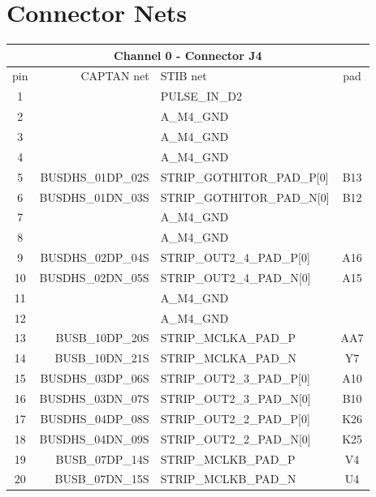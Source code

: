 \documentclass[11pt]{article}
\begin{document}
\section{Connector Nets}
\begin{table}
\begin{center}
\scriptsize
\begin{tabular}{|c|r|l|c|} \hline
\multicolumn{4}{|c|}{Channel 0 - Connector J4} \\ \hline
pin & CAPTAN net & STIB net & pad \\ \hline\hline
 1 &                   & PULSE\_IN\_D2              &    \\
 2 &                   & A\_M4\_GND                 &    \\ \hline
 3 &                   & A\_M4\_GND                 &    \\
 4 &                   & A\_M4\_GND                 &    \\ \hline
 5 & BUSDHS\_01DP\_02S & STRIP\_GOTHITOR\_PAD\_P[0] & B13 \\
 6 & BUSDHS\_01DN\_03S & STRIP\_GOTHITOR\_PAD\_N[0] & B12 \\ \hline
 7 &                   & A\_M4\_GND                 &    \\
 8 &                   & A\_M4\_GND                 &    \\ \hline
 9 & BUSDHS\_02DP\_04S & STRIP\_OUT2\_4\_PAD\_P[0]  & A16 \\
10 & BUSDHS\_02DN\_05S & STRIP\_OUT2\_4\_PAD\_N[0]  & A15 \\ \hline
11 &                   & A\_M4\_GND &    \\
12 &                   & A\_M4\_GND &    \\ \hline
13 &   BUSB\_10DP\_20S & STRIP\_MCLKA\_PAD\_P       & AA7 \\
14 &   BUSB\_10DN\_21S & STRIP\_MCLKA\_PAD\_N       & Y7 \\ \hline
15 & BUSDHS\_03DP\_06S & STRIP\_OUT2\_3\_PAD\_P[0]  &  A10 \\
16 & BUSDHS\_03DN\_07S & STRIP\_OUT2\_3\_PAD\_N[0]  &  B10 \\ \hline
17 & BUSDHS\_04DP\_08S & STRIP\_OUT2\_2\_PAD\_P[0]  &  K26 \\
18 & BUSDHS\_04DN\_09S & STRIP\_OUT2\_2\_PAD\_N[0]  &  K25 \\ \hline
19 &   BUSB\_07DP\_14S & STRIP\_MCLKB\_PAD\_P       & V4   \\
20 &   BUSB\_07DN\_15S & STRIP\_MCLKB\_PAD\_N       & U4   \\ \hline

\end{tabular}
\end{center}
\end{table}
\end{document}
